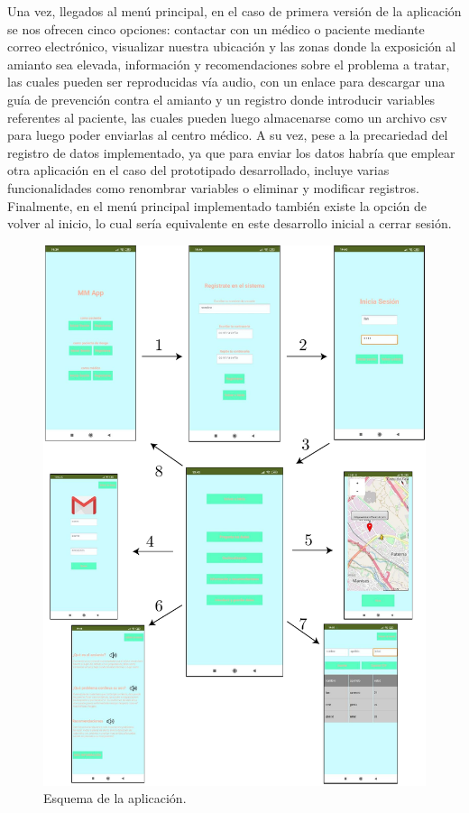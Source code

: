 \documentclass{article}
\begin{document}
Una vez, llegados al menú principal, en el caso de primera versión  de
la aplicación se nos ofrecen cinco opciones: contactar con un médico o
paciente mediante correo electrónico, visualizar nuestra  ubicación  y
las zonas donde la exposición al amianto sea  elevada,	información  y
recomendaciones sobre el problema a  tratar,  las  cuales  pueden  ser
reproducidas vía audio, con un	enlace	para  descargar  una  guía  de
prevención contra el amianto y un registro donde introducir  variables
referentes al paciente, las cuales pueden luego  almacenarse  como  un
archivo csv para luego poder enviarlas al centro médico.   A  su  vez,
pese a la precariedad del registro de datos implementado, ya que  para
enviar los datos habría que emplear otra aplicación  en  el  caso  del
prototipado  desarrollado,   incluye   varias	funcionalidades   como
renombrar variables o eliminar y modificar registros.  Finalmente,  en
el menú principal implementado también existe la opción de  volver  al
inicio, lo cual sería equivalente en este desarrollo inicial a	cerrar
sesión.

\newpage
\begin{figure}[h!]
\centering
\includegraphics[width = 0.8\linewidth]{../images/esquema_aplicacion.pdf}
\caption{Esquema de la aplicación.}
\end{figure}
\end{document}

